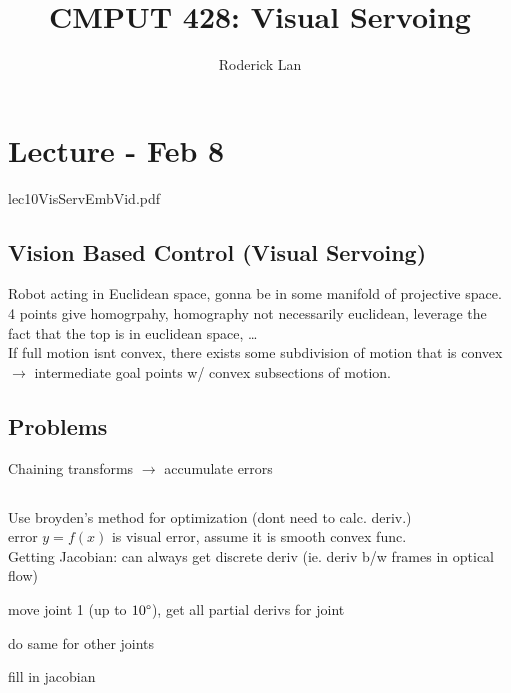 \documentclass{article}
\title{CMPUT 428: Visual Servoing}
\author{Roderick Lan}
\date{}
\begin{document}
\makeatother
{}

\maketitle
\tableofcontents
\break

\section{Lecture - Feb 8}
lec10VisServEmbVid.pdf
\subsection{Vision Based Control (Visual Servoing)}
Robot acting in Euclidean space, gonna be in some manifold of projective space.
\\
4 points give homogrpahy, homography not necessarily euclidean, leverage the fact that the 
top is in euclidean space, \dots
\\
If full motion isnt convex, there exists some subdivision of motion that is convex $\to$ 
intermediate goal points w/ convex subsections of motion.

\subsection{Problems}
Chaining transforms $\to$ accumulate errors
\subsection{}
Use broyden's method for optimization (dont need to calc. deriv.)
\\
error $y=f(x)$ is visual error, assume it is smooth convex func. \\
Getting Jacobian: can always get discrete deriv 
(ie. deriv b/w frames in optical flow)
\begin{list}{}{}
    \item move joint 1 (up to $10\degree$), get all partial derivs for joint
    \item do same for other joints
    \item fill in jacobian 
\end{list}
\end{document}
